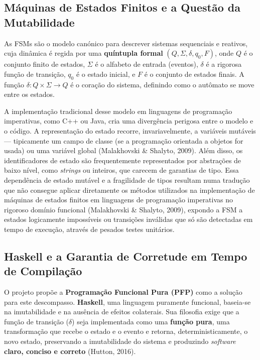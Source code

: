 \documentclass[12pt,a4paper]{article}
\begin{document}
\subsection{Máquinas de Estados Finitos e a Questão da Mutabilidade}

As FSMs são o modelo canónico para descrever sistemas sequenciais e reativos, cuja dinâmica é regida por uma \textbf{quíntupla formal} $(Q, \Sigma, \delta, q_0, F)$, onde $Q$ é o conjunto finito de estados, $\Sigma$ é o alfabeto de entrada (eventos), $\delta$ é a rigorosa função de transição, $q_0$ é o estado inicial, e $F$ é o conjunto de estados finais. A função $\delta: Q \times \Sigma \to Q$ é o coração do sistema, definindo como o autômato se move entre os estados.

A implementação tradicional desse modelo em linguagens de programação imperativas, como C++ ou Java, cria uma divergência perigosa entre o modelo e o código. A representação do estado recorre, invariavelmente, a variáveis mutáveis --- tipicamente um campo de classe (se a programação orientada a objetos for usada) ou uma variável global (Malakhovski \& Shalyto, 2009). Além disso, os identificadores de estado são frequentemente representados por abstrações de baixo nível, como \textit{strings} ou inteiros, que carecem de garantias de tipo. Essa dependência de estado mutável e a fragilidade de tipos resultam numa tradução que não consegue aplicar diretamente os métodos utilizados na implementação de máquinas de estados finitos em linguagens de programação imperativas no rigoroso domínio funcional (Malakhovski \& Shalyto, 2009), expondo a FSM a estados logicamente impossíveis ou transições inválidas que só são detectadas em tempo de execução, através de pesados testes unitários.

\subsection{Haskell e a Garantia de Corretude em Tempo de Compilação}
O projeto propõe a \textbf{Programação Funcional Pura (PFP)} como a solução para este descompasso. \textbf{Haskell}, uma linguagem puramente funcional, baseia-se na imutabilidade e na ausência de efeitos colaterais. Sua filosofia exige que a função de transição ($\delta$) seja implementada como uma \textbf{função pura}, uma transformação que recebe o estado e o evento e retorna, deterministicamente, o novo estado, preservando a imutabilidade do sistema e produzindo \textit{software} \textbf{claro, conciso e correto} (Hutton, 2016).
\end{document}
